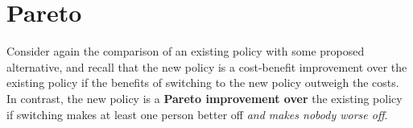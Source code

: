 






\section{Pareto}

Consider again the comparison of an existing policy with some proposed alternative, and recall that the new policy is a cost-benefit improvement over the existing policy if the benefits of switching to the new policy outweigh the costs. In contrast, the new policy is a \textbf{Pareto improvement over} the existing policy if switching makes at least one person better off \emph{and makes nobody worse off}.

